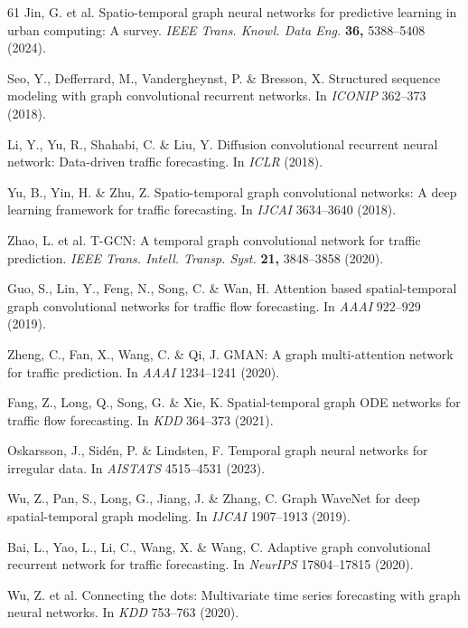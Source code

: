 \documentclass[fleqn,10pt]{wlscirep}
\begin{document}
\begin{thebibliography}{61}
Jin, G. et al. Spatio-temporal graph neural networks for predictive
  learning in urban computing: A survey. \textit{IEEE Trans. Knowl. Data
  Eng.} \textbf{36,} 5388--5408 (2024).

Seo, Y., Defferrard, M., Vandergheynst, P. \& Bresson, X. Structured
  sequence modeling with graph convolutional recurrent networks. In
  \textit{ICONIP} 362--373 (2018).

Li, Y., Yu, R., Shahabi, C. \& Liu, Y. Diffusion convolutional recurrent
  neural network: Data-driven traffic forecasting. In \textit{ICLR} (2018).

Yu, B., Yin, H. \& Zhu, Z. Spatio-temporal graph convolutional networks: A
  deep learning framework for traffic forecasting. In \textit{IJCAI}
  3634--3640 (2018).

Zhao, L. et al. T-GCN: A temporal graph convolutional network for traffic
  prediction. \textit{IEEE Trans. Intell. Transp. Syst.} \textbf{21,}
  3848--3858 (2020).

Guo, S., Lin, Y., Feng, N., Song, C. \& Wan, H. Attention based
  spatial-temporal graph convolutional networks for traffic flow
  forecasting. In \textit{AAAI} 922--929 (2019).

Zheng, C., Fan, X., Wang, C. \& Qi, J. GMAN: A graph multi-attention
  network for traffic prediction. In \textit{AAAI} 1234--1241 (2020).

Fang, Z., Long, Q., Song, G. \& Xie, K. Spatial-temporal graph ODE
  networks for traffic flow forecasting. In \textit{KDD} 364--373 (2021).

Oskarsson, J., Sid\'en, P. \& Lindsten, F. Temporal graph neural networks
  for irregular data. In \textit{AISTATS} 4515--4531 (2023).

Wu, Z., Pan, S., Long, G., Jiang, J. \& Zhang, C. Graph WaveNet for deep
  spatial-temporal graph modeling. In \textit{IJCAI} 1907--1913 (2019).

Bai, L., Yao, L., Li, C., Wang, X. \& Wang, C. Adaptive graph
  convolutional recurrent network for traffic forecasting. In
  \textit{NeurIPS} 17804--17815 (2020).

Wu, Z. et al. Connecting the dots: Multivariate time series forecasting
  with graph neural networks. In \textit{KDD} 753--763 (2020).


\end{thebibliography}
\end{document}
